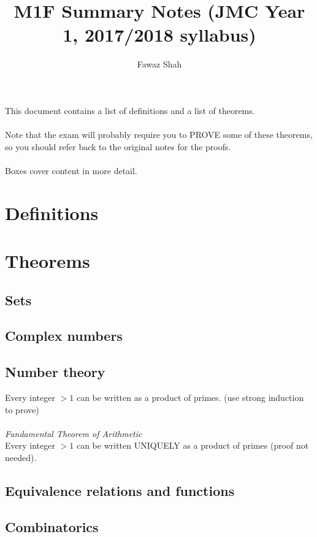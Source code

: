 \documentclass{article}
\title{M1F Summary Notes (JMC Year 1, 2017/2018 syllabus)}
\date{}
\author{Fawaz Shah}
\begin{document}
\large
\maketitle
\noindent This document contains a list of definitions and a list of theorems.
\\\\
Note that the exam will probably require you to PROVE some of these theorems, so you should refer back to the original notes for the proofs.
\\\\
Boxes cover content in more detail.
\tableofcontents
\newpage

\section{Definitions}
\section{Theorems}
\subsection{Sets}
\subsection{Complex numbers}
\subsection{Number theory}
Every integer $ > 1 $ can be written as a product of primes. (use strong induction to prove)
\\\\
\textit{Fundamental Theorem of Arithmetic}
\\
Every integer $ > 1 $ can be written UNIQUELY as a product of primes (proof not needed).
\subsection{Equivalence relations and functions}
\subsection{Combinatorics}
\end{document}
